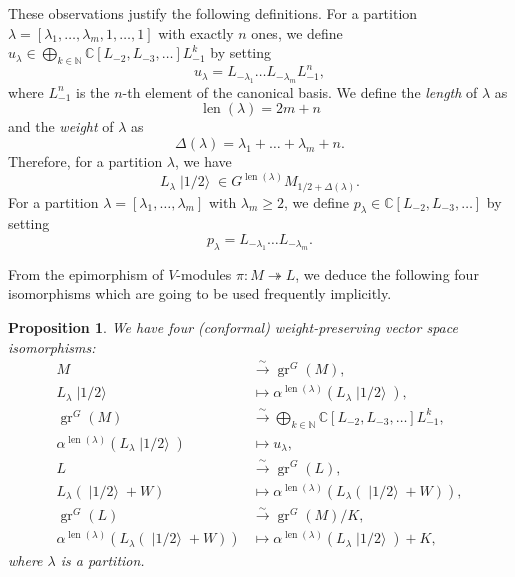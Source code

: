 \documentclass[a4paper, 12pt, reqno]{amsart}
\newtheorem{proposition}[theorem]{Proposition}
\theoremstyle{remark}
\DeclareMathOperator{\gr}{gr}
\DeclareMathOperator{\len}{len}
\DeclareMathOperator{\vachalf}{|1/2\rangle}
\begin{document}
These observations justify the following definitions.
For a partition $\lambda = [\lambda_1, \dots, \lambda_m, 1, \dots, 1]$ with exactly $n$ ones, we define $u_{\lambda} \in \bigoplus_{k \in \mathbb{N}}\mathbb{C}[L_{-2}, L_{-3}, \dots]L_{-1}^k$ by setting
\begin{equation*}
  u_{\lambda} = L_{-\lambda_1}\dots L_{-\lambda_m}L_{-1}^n,
\end{equation*}
where $L_{-1}^n$ is the $n$-th element of the canonical basis.
We define the \emph{length} of $\lambda$ as
\begin{equation*}
  \len(\lambda) = 2m + n
\end{equation*}
and the \emph{weight} of $\lambda$ as
\begin{equation*}
  \Delta(\lambda) = \lambda_1 + \dots + \lambda_m + n.
\end{equation*}
Therefore, for a partition $\lambda$, we have
\begin{equation*}
  L_{\lambda}\vachalf \in G^{\len(\lambda)}M_{1/2 + \Delta(\lambda)}.
\end{equation*}
For a partition $\lambda = [\lambda_1, \dots, \lambda_m]$ with $\lambda_m \ge 2$, we define $p_{\lambda} \in \mathbb{C}[L_{-2}, L_{-3}, \dots]$ by setting
\begin{equation*}
  p_{\lambda} = L_{-\lambda_1}\dots L_{-\lambda_m}.
\end{equation*}

From the epimorphism of $V$-modules $\pi: M \twoheadrightarrow L$, we deduce the following four isomorphisms which are going to be used frequently implicitly.

\begin{proposition}
  \label{prp:4}
  We have four (conformal) weight-preserving vector space isomorphisms:
  \begin{align*}
    M &\xrightarrow{\sim} \gr^G(M), \\
    L_{\lambda}\vachalf &\mapsto \alpha^{\len(\lambda)}(L_{\lambda}\vachalf), \\
    \gr^G(M) &\xrightarrow{\sim} \bigoplus_{k \in \mathbb{N}}\mathbb{C}[L_{-2}, L_{-3}, \dots]L_{-1}^k, \\
    \alpha^{\len(\lambda)}(L_{\lambda}\vachalf) &\mapsto u_{\lambda}, \\
    L &\xrightarrow{\sim} \gr^G(L), \\
    L_{\lambda}(\vachalf + W) &\mapsto \alpha^{\len(\lambda)}(L_{\lambda}(\vachalf + W)), \\
    \gr^G(L) &\xrightarrow{\sim} \gr^G(M)/K, \\
    \alpha^{\len(\lambda)}(L_{\lambda}(\vachalf + W)) &\mapsto \alpha^{\len(\lambda)}(L_{\lambda}\vachalf) + K,
  \end{align*}
  where $\lambda$ is a partition.
\end{proposition}
\end{document}
